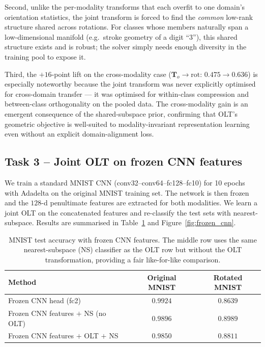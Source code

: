\documentclass[10pt]{article}
\newcommand{\T}{\mathbf{T}}
\begin{document}
Second, unlike the per-modality transforms that each overfit to one
domain's orientation statistics, the joint transform is forced to find
the \emph{common} low-rank structure shared across rotations. For
classes whose members naturally span a low-dimensional manifold
(e.g.\ stroke geometry of a digit ``3''), this shared structure exists
and is robust; the solver simply needs enough diversity in the training
pool to expose it.

Third, the $+16$-point lift on the cross-modality case
($\T_o\!\to\!\text{rot}$: $0.475\!\to\!0.636$) is especially
noteworthy because the joint transform was never explicitly optimised
for cross-domain transfer --- it was optimised for within-class
compression and between-class orthogonality on the pooled data. The
cross-modality gain is an emergent consequence of the shared-subspace
prior, confirming that OLT's geometric objective is well-suited to
modality-invariant representation learning even without an explicit
domain-alignment loss.

\subsection{Task 3 -- Joint OLT on frozen CNN features}

We train a standard MNIST CNN
(conv32--conv64--fc128--fc10) for 10
epochs with Adadelta on the original MNIST training set. The
network is then frozen and the $128$-d penultimate features are
extracted for both modalities. We learn a joint OLT on the
concatenated features and re-classify the test sets with
nearest-subspace. Results are summarised in Table~\ref{tab:frozen_cnn}
and Figure~\ref{fig:frozen_cnn}.

\begin{table}[h]\centering
\begin{tabular}{lcc}
\toprule
Method & Original MNIST & Rotated MNIST \\
\midrule
Frozen CNN head (fc2)               & $0.9924$ & $0.8639$ \\
Frozen CNN features $+$ NS (no OLT) & $0.9896$ & $\mathbf{0.8989}$ \\
Frozen CNN features $+$ OLT $+$ NS  & $0.9850$ & $0.8811$ \\
\bottomrule
\end{tabular}
\caption{MNIST test accuracy with frozen CNN features. The middle row
uses the same nearest-subspace (NS) classifier as the OLT row but
without the OLT transformation, providing a fair like-for-like
comparison.}
\label{tab:frozen_cnn}
\end{table}
\end{document}
